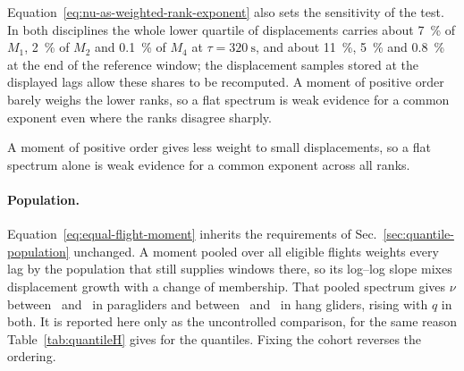Equation~\eqref{eq:nu-as-weighted-rank-exponent} also sets the sensitivity of the test.
\ifscalingresultsready
In both disciplines the whole lower quartile of displacements carries about
\SI{7}{\percent} of $M_1$, \SI{2}{\percent} of $M_2$ and \SI{0.1}{\percent} of $M_4$ at
$\tau=\SI{320}{\second}$, and about \SI{11}{\percent}, \SI{5}{\percent} and
\SI{0.8}{\percent} at the end of the reference window; the displacement samples stored
at the displayed lags allow these shares to be recomputed. A moment of positive order
barely weighs the lower ranks, so a flat spectrum is weak evidence for a common
exponent even where the ranks disagree sharply.

\else
A moment of positive order gives less weight to small displacements, so a flat
spectrum alone is weak evidence for a common exponent across all ranks.
\fi

\paragraph{Population.}
Equation~\eqref{eq:equal-flight-moment} inherits the requirements of
Sec.~\ref{sec:quantile-population} unchanged. A moment pooled over all eligible flights
weights every lag by the population that still supplies windows there, so its log--log
slope mixes displacement growth with a change of membership. That pooled spectrum gives
$\nu$ between \StatRevParaPooledMomentNuMin\ and \StatRevParaPooledMomentNuMax\ in
paragliders and between \StatRevHangPooledMomentNuMin\ and
\StatRevHangPooledMomentNuMax\ in hang gliders, rising with $q$ in both. It is reported
here only as the uncontrolled comparison, for the same reason
Table~\ref{tab:quantileH} gives for the quantiles.
\ifscalingresultsready
Fixing the cohort reverses the ordering.
\fi

\ifscalingresultsready
